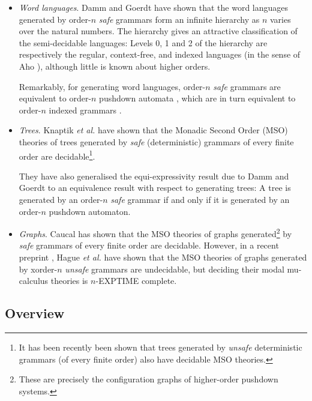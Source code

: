 \documentclass{llncs}
\begin{document}
\begin{itemize}
\item \emph{Word languages}. Damm and Goerdt \cite{DG86} have shown
  that the word languages generated by order-$n$ \emph{safe} grammars
  form an infinite hierarchy as $n$ varies over the natural numbers.
  The hierarchy gives an attractive classification of the
  semi-decidable languages: Levels 0, 1 and 2 of the hierarchy are
  respectively the regular, context-free, and indexed languages (in
  the sense of Aho \cite{Aho68}), although little is known about
  higher orders.

  Remarkably, for generating word languages, order-$n$ \emph{safe}
  grammars are equivalent to order-$n$ pushdown automata \cite{DG86},
  which are in turn equivalent to order-$n$ indexed grammars
  \cite{Mas74,Mas76}.

\item \emph{Trees}. Knaptik \emph{et al.} have shown that the Monadic
  Second Order (MSO) theories of trees generated by \emph{safe}
  (deterministic) grammars of every finite order are
  decidable\footnote{It has been recently been shown
    \cite{OngLics2006} that trees generated by \emph{unsafe}
    deterministic grammars (of every finite order) also have decidable
    MSO theories.}.

  They have also generalised the equi-expressivity result due to Damm
  and Goerdt \cite{DG86} to an equivalence result with respect to
  generating trees: A tree is generated by an order-$n$ \emph{safe}
  grammar if and only if it is generated by an order-$n$ pushdown
  automaton.

\item \emph{Graphs}. Caucal \cite{Cau02} has shown that the MSO
  theories of graphs generated\footnote{These are precisely the
    configuration graphs of higher-order pushdown systems.} by
  \emph{safe} grammars of every finite order are decidable. However,
  in a recent preprint \cite{hague-sto07}, Hague \emph{et al.} have
  shown that the MSO theories of graphs generated by xorder-$n$
  \emph{unsafe} grammars are undecidable, but deciding their modal
  mu-calculus theories is $n$-EXPTIME complete.
\end{itemize}

\subsection*{Overview}
\end{document}
